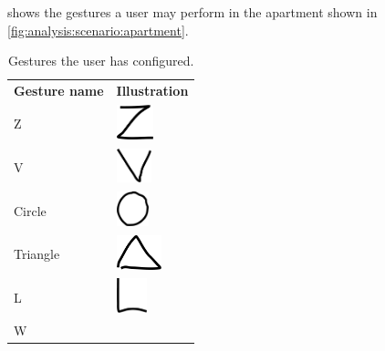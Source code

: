  shows the gestures a user may perform in the apartment shown in \cref{fig:analysis:scenario:apartment}.

\begin{table}[h!]
\centering
\caption{Gestures the user has configured.}
\label{tbl:analysis:scenario:gestures}
\begin{tabular}{ll}
\textbf{Gesture name} & \textbf{Illustration}
\\[0.2cm]
Z                     &  
\begin{minipage}{.3\textwidth}
  \includegraphics[height=1cm]{images/gesture-z}
\end{minipage}
\\[0.5cm]
V                     &
\begin{minipage}{.3\textwidth}
  \includegraphics[height=1cm]{images/gesture-v}
\end{minipage}
\\[0.5cm]
Circle                &
\begin{minipage}{.3\textwidth}
  \includegraphics[height=1cm]{images/gesture-circle}
\end{minipage}
\\[0.5cm]
Triangle              &
\begin{minipage}{.3\textwidth}
  \includegraphics[height=1cm]{images/gesture-triangle}
\end{minipage}
\\[0.5cm]
L                     &
\begin{minipage}{.3\textwidth}
  \includegraphics[height=1cm]{images/gesture-l}
\end{minipage}
\\[0.5cm]
W                     &
\begin{minipage}{.3\textwidth}

\end{minipage}
\end{tabular}
\end{table}
